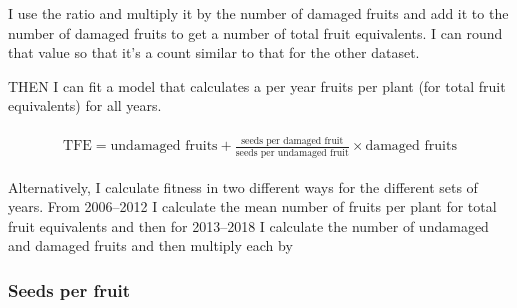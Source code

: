 \documentclass[12pt, oneside, titlepage]{article}   	%
\begin{document}
I use the ratio and multiply it by the number of damaged fruits and add it to the number of damaged fruits to get a number of total fruit equivalents. I can round that value so that it's a count similar to that for the other dataset. 

THEN I can fit a model that calculates a per year fruits per plant (for total fruit equivalents) for all years. 

%
    \begin{align}
\begin{split}
\textrm{TFE} = \textrm{undamaged fruits} + \frac{\textrm{seeds per damaged fruit}}{\textrm{seeds per undamaged fruit}}\times  \textrm{damaged fruits} 
  \end{split}
\end{align}
%

Alternatively, I calculate fitness in two different ways for the different sets of years. From 2006--2012 I calculate the mean number of fruits per plant for total fruit equivalents and then for 2013--2018 I calculate the number of undamaged and damaged fruits and then multiply each by 


\subsubsection*{Seeds per fruit}
\end{document}
